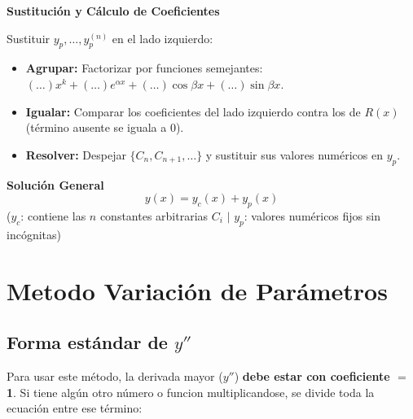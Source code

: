 \documentclass[10pt,letterpaper]{article}
\begin{document}
\begin{tcolorbox}
		\begin{tcolorbox}[
			colback=gray!5, colframe=gray!60,
			arc=2.5pt, boxrule=0.6pt, left=6pt, right=6pt, top=3pt, bottom=3pt
			]
			\footnotesize
			\textbf{Sustitución y Cálculo de Coeficientes}
			\vspace{0.04cm}
			\par\scriptsize
			Sustituir $y_p, \dots, y_p^{(n)}$ en el lado izquierdo:
			\par{}\par
			\vspace{-0.25cm}
			\begin{itemize}
				\setlength{\itemsep}{0pt}\setlength{\parskip}{0pt}\setlength{\leftmargini}{10pt}
				\item \textbf{Agrupar:} Factorizar por funciones semejantes: $(\dots)x^k + (\dots)e^{\alpha x} + (\dots)\cos\beta x + (\dots)\sin\beta x$.
				\item \textbf{Igualar:} Comparar los coeficientes del lado izquierdo contra los de $R(x)$ (término ausente se iguala a $0$).
				\item \textbf{Resolver:} Despejar $\{C_n, C_{n+1}, \dots\}$ y sustituir sus valores numéricos en $y_p$.
			\end{itemize}
		\end{tcolorbox}
		
		\vspace{0.12cm}
		
		\begin{tcolorbox}[
			colback=notablue!8, colframe=notablue,
			arc=2.5pt, boxrule=0.8pt, left=6pt, right=6pt, top=4pt, bottom=4pt
			]
			\footnotesize
			\textbf{\color{notablue}Solución General}
			\[
			y(x) = y_c(x) + y_p(x)
			\]
			\centering\scriptsize
			($y_c$: contiene las $n$ constantes arbitrarias $C_i$ \quad $\vert$ \quad $y_p$: valores numéricos fijos sin incógnitas)
		\end{tcolorbox}
		
	\end{tcolorbox}
	
	\newpage

	\section*{Metodo Variación de Parámetros}
	
	\subsection*{Forma estándar de $y''$}
	Para usar este método, la derivada mayor ($y''$) \textbf{debe estar con coeficiente $=$ 1}. Si tiene algún otro número o funcion multiplicandose, se divide toda la ecuación entre ese término:
	
\end{document}
